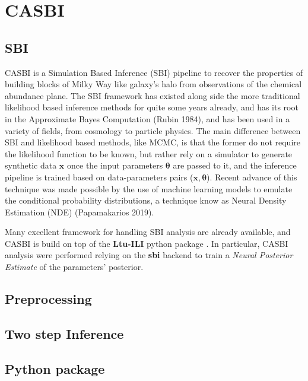 \chapter{CASBI}

\section{SBI}
CASBI is a Simulation Based Inference (SBI) pipeline to recover the properties of building blocks of Milky Way like galaxy's halo from observations of the chemical abundance plane. The SBI framework has existed along side the more traditional likelihood based inference methods for quite some years already, and has its root in the Approximate Bayes Computation (Rubin 1984), and has been used in a variety of fields, from cosmology to particle physics. The main difference between SBI and likelihood based methods, like MCMC, is that the former do not require the likelihood function to be known, but rather rely on a simulator to generate synthetic data \textbf{$\mathbf{x}$} once the input parameters $\boldsymbol{\theta}$ are passed to it, and the inference pipeline is trained based on data-parameters pairs ($\mathbf{x}, \boldsymbol{\theta}$). Recent advance of this technique was made possible by the use of machine learning models to emulate the conditional probability distributions, a technique know as Neural Density Estimation (NDE) (Papamakarios 2019). 

Many excellent framework for handling SBI analysis are already available, and CASBI is build on top of the \textbf{Ltu-ILI} python package \cite{hoLtUILIAllinOneFramework2024}. In particular, CASBI analysis were performed relying on the \textbf{sbi} backend \cite{tejero-canteroSbiToolkitSimulationbased2020} to train a \textit{Neural Posterior Estimate} of the parameters' posterior. 


\section{Preprocessing}

\section{Two step Inference}

\section{Python package}